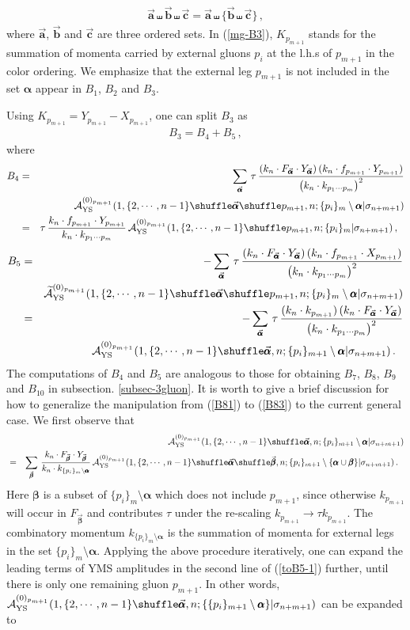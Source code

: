 \documentclass[preprint,showpacs,onecolumn,nofootinbib]{revtex4}
\newcommand{\bea}{\begin{eqnarray}}
\newcommand{\eea}{\end{eqnarray}}
\newcommand{\nn}{\nonumber \\}
\def\W #1{\widetilde{#1}}
\def\eref#1{(\ref{#1})}
\def\a{{\alpha}}
\def\b{{\beta}}
\begin{document}
%
\bea
\vec{\pmb{a}}\shuffle\vec{\pmb{b}}\shuffle\vec{\pmb{c}}=\vec{\pmb{a}}\shuffle\{\vec{\pmb{b}}\shuffle\vec{\pmb{c}}\}\,,
\eea
%
where $\vec{\pmb{a}}$, $\vec{\pmb{b}}$ and $\vec{\pmb{c}}$ are three ordered sets. In \eref{mg-B3}, $K_{p_{m+1}}$ stands for the summation of momenta carried by external gluons $p_i$ at the l.h.s of $p_{m+1}$ in the color ordering. We emphasize that the external leg $p_{m+1}$ is not included in the set $\pmb{\a}$ appear
in $B_1$, $B_2$ and $B_3$.

Using $K_{p_{m+1}}=Y_{p_{m+1}}-X_{p_{m+1}}$, one can split $B_3$ as
%
\bea
B_3=B_4+B_5\,,
\eea
%
where
%
\bea
B_4&=&\sum_{\vec{\pmb{\a}}}\,\tau\,{(k_n\cdot F_{\vec{\pmb{\a}}}\cdot Y_{\vec{\pmb{\a}}})\,(k_n\cdot f_{p_{m+1}}\cdot Y_{p_{m+1}})\over \big(k_n\cdot k_{p_1\cdots p_m}\big)^2}\nn
& &{\cal A}^{(0)_{p_{m+1}}}_{\rm YS}(1,\{2,\cdots,n-1\}\shuffle\vec{\pmb{\a}}\shuffle p_{m+1},n;\{p_i\}_m\setminus\pmb{\a}|\sigma_{n+m+1})\nn
&=&\tau\,{k_n\cdot f_{p_{m+1}}\cdot Y_{p_{m+1}}\over k_n\cdot k_{p_1\cdots p_m}}\,{\cal A}^{(0)_{p_{m+1}}}_{\rm YS}(1,\{2,\cdots,n-1\}\shuffle p_{m+1},n;\{p_i\}_m|\sigma_{n+m+1})\,,~~\label{mg-B4}
\eea
%
%
\bea
B_5&=&-\sum_{\vec{\pmb{\a}}}\,\tau\,{(k_n\cdot F_{\vec{\pmb{\a}}}\cdot Y_{\vec{\pmb{\a}}})\,(k_n\cdot f_{p_{m+1}}\cdot X_{p_{m+1}})\over \big(k_n\cdot k_{p_1\cdots p_m}\big)^2}\nn
& &\W{\cal A}^{(0)_{p_{m+1}}}_{\rm YS}(1,\{2,\cdots,n-1\}\shuffle\vec{\pmb{\a}}\shuffle p_{m+1},n;\{p_i\}_m\setminus\pmb{\a}|\sigma_{n+m+1})\nn
&=&-\sum_{\vec{\pmb{\a}}}\,\tau\,{(k_n\cdot k_{p_{m+1}})\,(k_n\cdot F_{\vec{\pmb{\a}}}\cdot Y_{\vec{\pmb{\a}}})\over \big(k_n\cdot k_{p_1\cdots p_m}\big)^2}\nn
& &{\cal A}^{(0)_{p_{m+1}}}_{\rm YS}(1,\{2,\cdots,n-1\}\shuffle\vec{\pmb{\a}},n;\{p_i\}_{m+1}\setminus\pmb{\a}|\sigma_{n+m+1})\,.~~\label{mg-B5}
\eea
%
The computations of $B_4$ and $B_5$ are analogous to those for obtaining $B_7$, $B_8$, $B_9$ and $B_{10}$ in subsection. \ref{subsec-3gluon}. It is worth to give a brief discussion for how to generalize the manipulation from \eref{B81} to \eref{B83} to the current general case. We first observe that
%
\bea
& &{\cal A}^{(0)_{p_{m+1}}}_{\rm YS}(1,\{2,\cdots,n-1\}\shuffle\vec{\pmb{\a}},n;\{p_i\}_{m+1}\setminus\pmb{\a}|\sigma_{n+m+1})\nn
&=&\sum_{\vec{\pmb{\b}}}\,{k_n\cdot F_{\vec{\pmb{\b}}}\cdot Y_{\vec{\pmb{\b}}}\over k_n\cdot k_{\{p_i\}_{m}\setminus\pmb{\a}}}\,
{\cal A}^{(0)_{p_{m+1}}}_{\rm YS}(1,\{2,\cdots,n-1\}\shuffle\vec{\pmb{\a}}\shuffle\vec{\pmb{\b}},n;\{p_i\}_{m+1}\setminus\{\pmb{\a}\cup\pmb{\b}\}|\sigma_{n+m+1})\,.
~~\label{toB5-1}
\eea
%
Here $\pmb{\b}$ is a subset of $\{p_i\}_m\setminus\pmb{\a}$ which does not include $p_{m+1}$, since otherwise $k_{p_{m+1}}$ will occur in $F_{\vec{\pmb{\b}}}$ and contributes $\tau$ under the re-scaling $k_{p_{m+1}}\to\tau k_{p_{m+1}}$. The combinatory momentum $k_{\{p_i\}_m\setminus\pmb{\a}}$ is the summation of momenta for external legs in the set $\{p_i\}_m\setminus\pmb{\a}$. Applying the above procedure iteratively, one can expand the leading terms of YMS amplitudes in the second line of \eref{toB5-1} further, until there is only one remaining gluon $p_{m+1}$. In other words, ${\cal A}^{(0)_{p_{m+1}}}_{\rm YS}(1,\{2,\cdots,n-1\}\shuffle\vec{\pmb{\a}},n;\{\{p_i\}_{m+1}\setminus\pmb{\a}\}|\sigma_{n+m+1})$ can be expanded to
\end{document}
